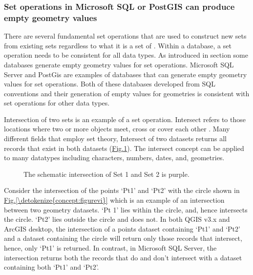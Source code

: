 \documentclass[letterpaper,10pt,english]{sphinxmanual}
\begin{document}
\subsubsection{Set operations in Microsoft SQL or PostGIS can produce empty geometry values}
\label{\detokenize{concept:set-operations-in-microsoft-sql-or-postgis-can-produce-empty-geometry-values}}
There are several fundamental set operations that are used to construct new sets from existing sets regardless to what it is a set of .  Within a database, a set operation needs to be consistent for all data types.  As introduced in section  some databases generate empty geometry values for set operations.  Microsoft SQL Server and PostGis are examples of databases that can generate empty geometry values for set operations.  Both of these databases developed from SQL conventions and their generation of empty values for geometries is consistent with set operations for other data types.

Intersection of two sets is an example of a set operation.  Intersect refers to those locations where two or more objects meet, cross or cover each other .  Many different fields that employ set theory, Intersect of two datasets returns all records that exist in both datasets (\hyperref[\detokenize{concept:figurev}]{Fig.\@ \ref{\detokenize{concept:figurev}}}).  The intersect concept can be applied to many datatypes including characters, numbers, dates, and, geometries.

\begin{figure}[htbp]
\centering
\capstart

\noindent{}
\caption{The schematic intersection of Set 1 and Set 2 is purple.}\label{\detokenize{concept:id60}}\label{\detokenize{concept:figurev}}\end{figure}

Consider the intersection of the points ‘Pt1’ and ‘Pt2’ with the circle shown in \hyperref[\detokenize{concept:figurevi}]{Fig.\@ \ref{\detokenize{concept:figurevi}}} which is an example of an intersection between two geometry datasets.  ‘Pt 1’ lies within the circle, and, hence intersects the circle.  ‘Pt2’ lies outside the circle and does not.  In both QGIS v3.x and ArcGIS desktop, the intersection of a points dataset containing ‘Pt1’ and ‘Pt2’ and a dataset containing the circle will return only those records that intersect, hence, only ‘Pt1’ is returned.  In contrast, in Microsoft SQL Server, the intersection returns both the records that do and don’t intersect with a dataset containing both ‘Pt1’ and ‘Pt2’.
\end{document}
